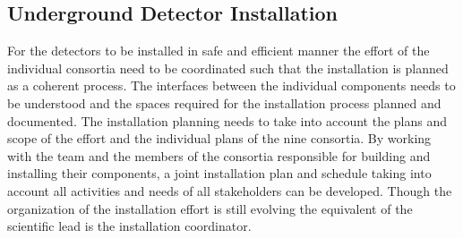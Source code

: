
 







%

\subsection{Underground Detector Installation}
\label{sec:fdsp-coord-undergd}

For the  detectors to be installed in safe and efficient
manner the effort of the individual consortia need to be coordinated
such that the installation is planned as a coherent process. The
interfaces between the individual components needs to be understood
and the spaces required for the installation process planned and
documented. The installation planning needs to take into account the
plans and scope of the  effort and the individual plans of
the nine consortia. By working with the  team and the
members of the consortia responsible for building and installing their
components, a joint installation plan and schedule taking into account
all activities and needs of all stakeholders can be developed. Though
the organization of the installation effort is still evolving the
equivalent of the scientific lead is the installation coordinator.

